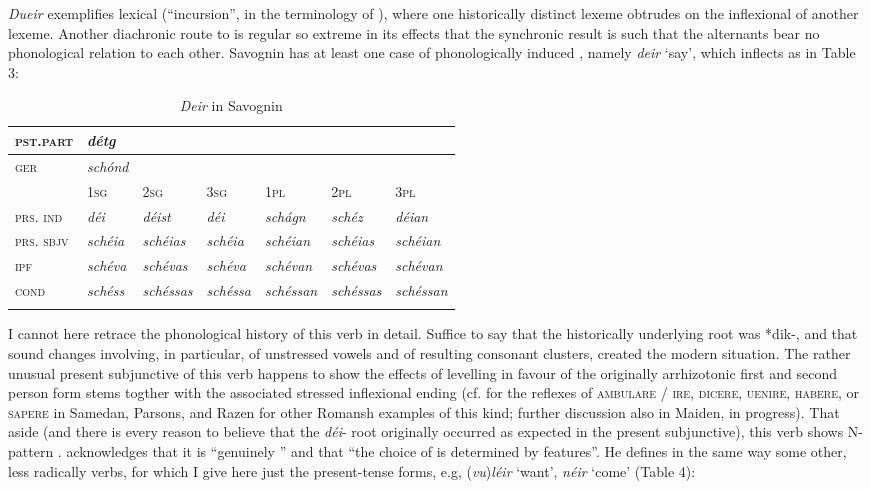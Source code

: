 \documentclass[output=paper,
modfonts
]{LSP/langsci}
\begin{document}
\emph{Dueir} exemplifies lexical  (``incursion'', in the
terminology of \citealt{corbett2007a}), where one historically distinct lexeme
obtrudes on the inflexional  of another lexeme. Another
diachronic route to  is regular  so extreme in its
effects that the synchronic result is  such that the
alternants bear no phonological relation to each other. Savognin has at
least one case of phonologically induced , namely \emph{deir}
`say', which inflects as in Table 3:


\begin{longtable}[]{@{}lllllll@{}}
\caption{ \emph{Deir} in Savognin}\\
\lsptoprule
\textsc{pst.part} & \emph{détg} & & & & &\tabularnewline
\midrule
\endhead
\textsc{ger} & \emph{schónd} & & & & &\tabularnewline
& \textsc{1sg} & \textsc{2sg} & \textsc{3sg} & \textsc{1pl} &
\textsc{2pl} & \textsc{3pl}\tabularnewline
\textsc{prs. ind} & \emph{déi} & \emph{déist} & \emph{déi} &
\emph{schágn} & \emph{schéz} & \emph{déian}\tabularnewline
\textsc{prs. sbjv} & \emph{schéia} & \emph{schéias} & \emph{schéia} &
\emph{schéian} & \emph{schéias} & \emph{schéian}\tabularnewline
\textsc{ipf} & \emph{schéva} & \emph{schévas} & \emph{schéva} &
\emph{schévan} & \emph{schévas} & \emph{schévan}\tabularnewline
\textsc{cond} & \emph{schéss} & \emph{schéssas} & \emph{schéssa} &
\emph{schéssan} & \emph{schéssas} & \emph{schéssan}\tabularnewline
\lspbottomrule
\end{longtable}

I cannot here retrace the phonological history of this verb in detail.
Suffice to say that the historically underlying root was *dik-, and that
sound changes involving, in particular,  of unstressed vowels
and  of resulting consonant clusters, created the modern
situation. The rather unusual present subjunctive of this verb happens
to show the effects of  levelling in favour of the originally
arrhizotonic first and second person  form stems togther with the
associated stressed inflexional ending (cf. \citealt{decurtins1958a} for the
reflexes of \textsc{ambulare / ire}, \textsc{dicere, uenire, habere,} or
\textsc{sapere} in Samedan, Parsons, and Razen for other Romansh
examples of this kind; further discussion also in Maiden, in progress).
That aside (and there is every reason to believe that the \emph{déi}-
root originally occurred as expected in the present subjunctive), this
verb shows N-pattern . \citet[17]{anderson2011a} acknowledges that it
is ``genuinely '' and that ``the choice of  is determined by
 features''. He defines in the same way some other, less
radically  verbs, for which I give here just the present-tense
forms, e.g, (\emph{vu})\emph{léir} `want', \emph{néir} `come' (Table 4):
\end{document}

